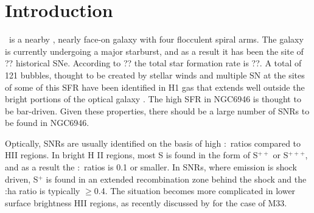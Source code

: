 

\section{Introduction} \label{sec:intro}

\gal\ is a nearby \cite[6.72$\pm$ 0.15 Mpc,][]{tikhonov14}, nearly face-on \cite[32.6$\degr$,][]{deblok08} galaxy with four flocculent spiral arms.  The galaxy is currently undergoing a major starburst, and as a result it has been the site of ?? historical SNe. According to ?? the total star formation rate is ??.  A total of 121 bubbles, thought to be created by stellar winds and multiple SN at the sites of some of this SFR have been identified in H1 gas that extends well outside the bright portions of the optical galaxy \citep{boomsma08}.  The high SFR in NGC6946 is thought to be bar-driven.   Given these properties, there should be a large number of SNRs to be found in NGC6946.   

Optically, SNRs are usually identified on the basis of high \sii:\ha\ ratios compared to HII regions.  In bright H II regions, most S is found in the form of S$^{++}$ or S$^{+++}$, and as a result the \sii:\ha\ ratios is 0.1 or smaller.  In SNRs, where emission is shock driven, S$^+$ is found in an extended recombination zone behind the shock and the \sii:ha ratio is typically $\geq$0.4.  The situation becomes more complicated in lower surface brightness HII regions, as recently discussed by \cite{long18} for the case of M33.

